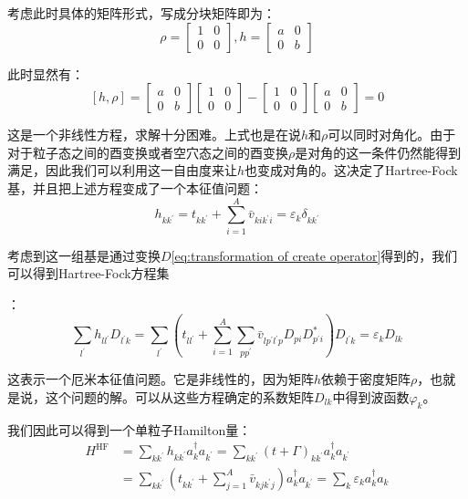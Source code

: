 \begin{booknote*}
考虑此时具体的矩阵形式，写成分块矩阵即为：
\[
\rho=\begin{bmatrix}1 & 0\\
0 & 0
\end{bmatrix},h=\begin{bmatrix}a & 0\\
0 & b
\end{bmatrix}
\]

此时显然有：
\[
[h,\rho]=\begin{bmatrix}a & 0\\
0 & b
\end{bmatrix}\begin{bmatrix}1 & 0\\
0 & 0
\end{bmatrix}-\begin{bmatrix}1 & 0\\
0 & 0
\end{bmatrix}\begin{bmatrix}a & 0\\
0 & b
\end{bmatrix}=0
\]
\end{booknote*}
这是一个非线性方程，求解十分困难。上式也是在说$h$和$\rho$可以同时对角化。由于对于粒子态之间的酉变换或者空穴态之间的酉变换$\rho$是对角的这一条件仍然能得到满足，因此我们可以利用这一自由度来让$h$也变成对角的。这决定了Hartree-Fock基，并且把上述方程变成了一个本征值问题：
\begin{equation}
h_{kk^{\prime}}=t_{kk^{\prime}}+\sum^{A}_{i=1}\bar{v}_{kik^{\prime}i}=\varepsilon_{k}\delta_{kk^{\prime}}\label{eq:single particle hamiltonian}
\end{equation}

考虑到这一组基是通过变换$D$\ref{eq:transformation of create operator}得到的，我们可以得到Hartree-Fock方程集

：
\[
\sum_{l^{\prime}}h_{ll^{\prime}}D_{l^{\prime}k}=\sum_{l^{\prime}}\left(t_{ll^{\prime}}+\sum^{A}_{i=1}\sum_{pp^{\prime}}\bar{v}_{lp^{\prime}l^{\prime}p}D_{pi}D^{*}_{p^{\prime}i}\right)D_{l^{\prime}k}=\varepsilon_{k}D_{lk}
\]

这表示一个厄米本征值问题。它是非线性的，因为矩阵$h$依赖于密度矩阵$\rho$，也就是说，这个问题的解。可以从这些方程确定的系数矩阵$D_{lk}$中得到波函数$\varphi_{k}$。

我们因此可以得到一个单粒子Hamilton量：
\begin{align*}
H^{\text{HF}} & =\sum_{kk^{\prime}}h_{kk^{\prime}}a^{\dagger}_{k}a_{k^{\prime}}=\sum_{kk^{\prime}}(t+\Gamma)_{kk^{\prime}}a^{\dagger}_{k}a_{k^{\prime}}\\
 & =\sum_{kk^{\prime}}\left(t_{kk^{\prime}}+\sum^{A}_{j=1}\bar{v}_{kjk^{\prime}j}\right)a^{\dagger}_{k}a_{k^{\prime}}=\sum_{k}\varepsilon_{k}a^{\dagger}_{k}a_{k}
\end{align*}

